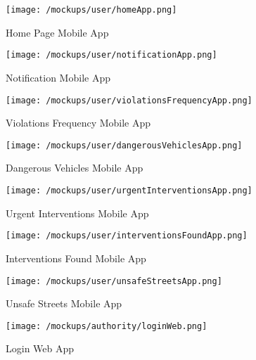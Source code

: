 	\begin{figure}[ht!]
		\centering
		\begin{minipage}{0.5\textwidth}
			\centering
			\texttt{[image: /mockups/user/homeApp.png]}
			\caption{Home Page Mobile App}
		\end{minipage}\hfill
		\begin{minipage}{0.5\textwidth}
			\centering
			\texttt{[image: /mockups/user/notificationApp.png]}
			\caption{Notification Mobile App}
		\end{minipage}
	\end{figure}

	\begin{figure}[h!]
		\centering
		\begin{minipage}{0.45\textwidth}
			\centering
			\texttt{[image: /mockups/user/violationsFrequencyApp.png]}
			\caption{Violations Frequency Mobile App}
		\end{minipage}\hfill
		\begin{minipage}{0.45\textwidth}
			\centering
			\texttt{[image: /mockups/user/dangerousVehiclesApp.png]}
			\caption{Dangerous Vehicles Mobile App}
		\end{minipage}
	\end{figure}

	\begin{figure}[h!]
		\centering
		\begin{minipage}{0.45\textwidth}
			\centering
			\texttt{[image: /mockups/user/urgentInterventionsApp.png]}
			\caption{Urgent Interventions Mobile App}
		\end{minipage}\hfill
		\begin{minipage}{0.45\textwidth}
			\centering
			\texttt{[image: /mockups/user/interventionsFoundApp.png]}
			\caption{Interventions Found Mobile App}
		\end{minipage}
	\end{figure}

	\begin{figure}[h!]
		\centering
		\begin{minipage}{0.45\textwidth}
			\centering
			\texttt{[image: /mockups/user/unsafeStreetsApp.png]}
			\caption{Unsafe Streets Mobile App}
		\end{minipage}
	\end{figure}
	
	\begin{figure}[h!]
		\centering
		\texttt{[image: /mockups/authority/loginWeb.png]}
		\caption{Login Web App}
	\end{figure}

